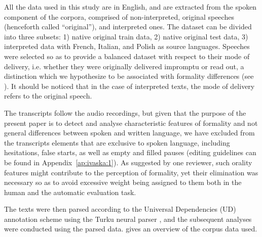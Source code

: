 \documentclass[output=paper]{langscibook}
\begin{document}
All the data used in this study are in English, and are extracted from the spoken component of the corpora, comprised of non-interpreted, original speeches (henceforth called “original”), and interpreted ones. The dataset can be divided into three subsets: 1) native original train data, 2) native original test data, 3) interpreted data with French, Italian, and Polish as source languages. Speeches were selected so as to provide a balanced dataset with respect to their mode of delivery, i.e. whether they were originally delivered impromptu or read out, a distinction which we hypothesize to be associated with formality differences (see ). It should be noticed that in the case of interpreted texts, the mode of delivery refers to the original speech.

The transcripts follow the audio recordings, but given that the purpose of the present paper is to detect and analyse characteristic features of formality and not general differences between spoken and written language, we have excluded from the transcripts elements that are exclusive to spoken language, including hesitations, false starts, as well as empty and filled pauses (editing guidelines can be found in Appendix~\ref{ap:ivaska:1}). As suggested by one reviewer, such orality features might contribute to the perception of formality, yet their elimination was necessary so as to avoid excessive weight being assigned to them both in the human and the automatic evaluation task.

The texts were then parsed according to the Universal Dependencies (UD) annotation scheme using the Turku neural parser \citep{KanervaEtAl2018}, and the subsequent analyses were conducted using the parsed data.  gives an overview of the corpus data used.
\end{document}
